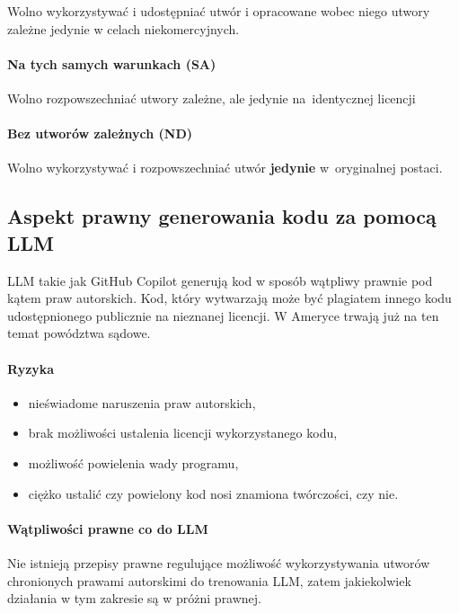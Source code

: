 \documentclass{article}
\begin{document}
Wolno wykorzystywać i udostępniać utwór i opracowane wobec niego utwory zależne jedynie w celach niekomercyjnych.

\paragraph{Na tych samych warunkach (SA)}

Wolno rozpowszechniać utwory zależne, ale jedynie na~identycznej licencji

\paragraph{Bez utworów zależnych (ND)}

Wolno wykorzystywać i rozpowszechniać utwór \textbf{jedynie} w~oryginalnej postaci.

\subsection{Aspekt prawny generowania kodu za pomocą LLM}

LLM takie jak GitHub Copilot generują kod w sposób wątpliwy prawnie pod kątem praw autorskich. Kod, który wytwarzają może być plagiatem innego kodu udostępnionego publicznie na nieznanej licencji. W Ameryce trwają już na ten temat powództwa sądowe.

\paragraph{Ryzyka}

\begin{itemize}
  \item nieświadome naruszenia praw autorskich,
  \item brak możliwości ustalenia licencji wykorzystanego kodu,
  \item możliwość powielenia wady programu,
  \item ciężko ustalić czy powielony kod nosi znamiona twórczości, czy nie.
\end{itemize}

\paragraph{Wątpliwości prawne co do LLM}

Nie istnieją przepisy prawne regulujące możliwość wykorzystywania utworów chronionych prawami autorskimi do trenowania LLM, zatem jakiekolwiek działania w tym zakresie są w próżni prawnej.
\end{document}

